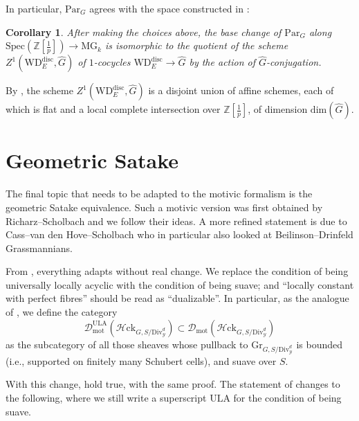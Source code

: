 \documentclass[11pt]{amsart}
\numberwithin{equation}{section}
\numberwithin{theorem}{section}
\newtheorem{corollary}[theorem]{Corollary}
\theoremstyle{definition}
\newcommand{\Hloc}{{\mathcal H}{\mathrm{ck}}}
\begin{document}
In particular, $\mathrm{Par}_G$ agrees with the space constructed in \cite{DHKM}:

\begin{corollary}\label{cor:comparisontoDHKM} After making the choices above, the base change of $\mathrm{Par}_G$ along $\mathrm{Spec}(\mathbb Z[\tfrac 1p])\to \mathrm{MG}_k$ is isomorphic to the quotient of the scheme $Z^1(\mathrm{WD}_E^{\mathrm{disc}},\widehat{G})$ of $1$-cocycles $\mathrm{WD}_E^{\mathrm{disc}}\to \widehat{G}$ by the action of $\widehat{G}$-conjugation.
\end{corollary}

By \cite{DHKM}, the scheme $Z^1(\mathrm{WD}_E^{\mathrm{disc}},\widehat{G})$ is a disjoint union of affine schemes, each of which is flat and a local complete intersection over $\mathbb Z[\tfrac 1p]$, of dimension $\mathrm{dim}(\widehat{G})$.

\section{Geometric Satake}

The final topic that needs to be adapted to the motivic formalism is the geometric Satake equivalence. Such a motivic version was first obtained by Richarz--Scholbach \cite{RicharzScholbach} and we follow their ideas. A more refined statement is due to Cass--van den Hove--Scholbach \cite{CassvandenHoveScholbach} who in particular also looked at Beilinson--Drinfeld Grassmannians.

From \cite[Section VI.1 -- VI.6]{FarguesScholze}, everything adapts without real change. We replace the condition of being universally locally acyclic with the condition of being suave; and ``locally constant with perfect fibres'' should be read as ``dualizable''. In particular, as the analogue of \cite[Definition VI.6.1]{FarguesScholze}, we define the category
\[
\mathcal D_{\mathrm{mot}}^{\mathrm{ULA}}(\Hloc_{G,S/\mathrm{Div}^d_{\mathcal Y}})\subset \mathcal D_{\mathrm{mot}}(\Hloc_{G,S/\mathrm{Div}^d_{\mathcal Y}})
\]
as the subcategory of all those sheaves whose pullback to $\mathrm{Gr}_{G,S/\mathrm{Div}^d_{\mathcal Y}}$ is bounded (i.e., supported on finitely many Schubert cells), and suave over $S$.

With this change, \cite[Proposition VI.6.4, VI.6.5, Corollary VI.6.6]{FarguesScholze} hold true, with the same proof. The statement of \cite[Corollary VI.6.7]{FarguesScholze} changes to the following, where we still write a superscript $\mathrm{ULA}$ for the condition of being suave.
\end{document}
